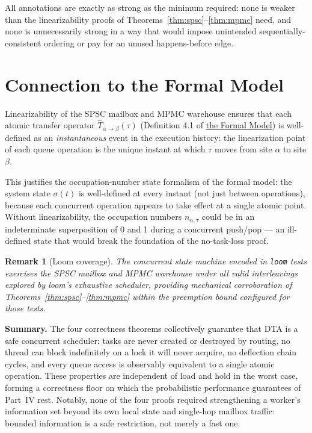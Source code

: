 \documentclass[11pt,a4paper]{report}
\newtheorem{remark}{Remark}[section]
\newcommand{\code}[1]{\texttt{#1}}
\begin{document}
All annotations are exactly as strong as the minimum required: none
is weaker than the linearizability proofs of
Theorems~\ref{thm:spsc}--\ref{thm:mpmc} need, and none is
unnecessarily strong in a way that would impose unintended
sequentially-consistent ordering or pay for an unused
happens-before edge.

\section{Connection to the Formal Model}
\label{sec:causal}

Linearizability of the SPSC mailbox and MPMC warehouse ensures that
each atomic transfer operator $\hat{T}_{\alpha \to \beta}(\tau)$
(Definition 4.1 of \hyperref[chap:formal_model]{the Formal Model}) is well-defined as an
\emph{instantaneous} event in the execution history: the
linearization point of each queue operation is the unique instant at
which $\tau$ moves from site $\alpha$ to site $\beta$.

This justifies the occupation-number state formalism of the formal
model: the system state $\sigma(t)$ is well-defined at every instant
(not just between operations), because each concurrent operation
appears to take effect at a single atomic point.  Without
linearizability, the occupation numbers $n_{\alpha,\tau}$ could be
in an indeterminate superposition of 0 and 1 during a concurrent
push/pop --- an ill-defined state that would break the foundation of
the no-task-loss proof.

\begin{remark}[Loom coverage]
The concurrent state machine encoded in \code{loom} tests exercises
the SPSC mailbox and MPMC warehouse under all valid interleavings
explored by loom's exhaustive scheduler, providing mechanical
corroboration of Theorems~\ref{thm:spsc}--\ref{thm:mpmc} within the
preemption bound configured for those tests.
\end{remark}


\bigskip
\noindent\textbf{Summary.}
The four correctness theorems collectively guarantee that DTA is a
safe concurrent scheduler: tasks are never created or destroyed by
routing, no thread can block indefinitely on a lock it will never acquire,
no deflection chain cycles, and every queue access is observably equivalent
to a single atomic operation.  These properties are independent of load
and hold in the worst case, forming a correctness floor on which the
probabilistic performance guarantees of Part~IV rest. Notably, none of
the four proofs required strengthening a worker's information set beyond
its own local state and single-hop mailbox traffic: bounded information
is a safe restriction, not merely a fast one.
\end{document}

